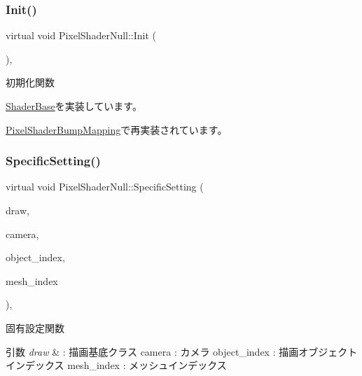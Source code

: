 \subsubsection{\texorpdfstring{Init()}{Init()}}
{\footnotesize\ttfamily virtual void Pixel\+Shader\+Null\+::\+Init (\begin{DoxyParamCaption}{ }\end{DoxyParamCaption})\hspace{0.3cm}{\ttfamily [inline]}, {\ttfamily [virtual]}}



初期化関数 



\mbox{\hyperlink{class_shader_base_a9622b2f5e0184a78d3af82820dc5113d}{Shader\+Base}}を実装しています。



\mbox{\hyperlink{class_pixel_shader_bump_mapping_ab7807b7c56242e965ddb23e66e1a5d9e}{Pixel\+Shader\+Bump\+Mapping}}で再実装されています。

\mbox{\label{class_pixel_shader_null_a8dd0194b5a22da5261ab35233a7cfdcd}} 
\subsubsection{\texorpdfstring{Specific\+Setting()}{SpecificSetting()}}
{\footnotesize\ttfamily virtual void Pixel\+Shader\+Null\+::\+Specific\+Setting (\begin{DoxyParamCaption}\item[{\mbox{\hyperlink{class_draw_base}{Draw\+Base}} $\ast$}]{draw,  }\item[{\mbox{\hyperlink{class_camera}{Camera}} $\ast$}]{camera,  }\item[{unsigned}]{object\+\_\+index,  }\item[{unsigned}]{mesh\+\_\+index }\end{DoxyParamCaption})\hspace{0.3cm}{\ttfamily [inline]}, {\ttfamily [virtual]}}



固有設定関数 


\begin{DoxyParams}{引数}
{\em draw} & \+: 描画基底クラス camera \+: カメラ object\+\_\+index \+: 描画オブジェクトインデックス mesh\+\_\+index \+: メッシュインデックス \\
\hline
\end{DoxyParams}


